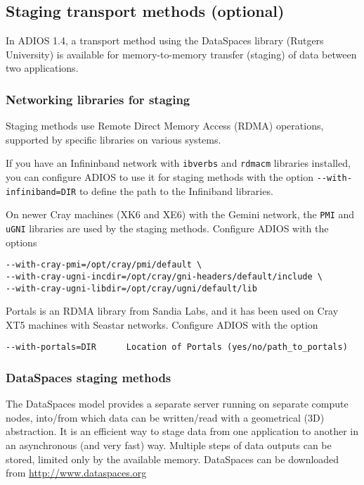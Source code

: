 \subsection{Staging transport methods (optional)}

In ADIOS 1.4, a transport method using the DataSpaces library (Rutgers University) 
is available for memory-to-memory transfer (staging) of data between two 
applications. 

\subsubsection{Networking libraries for staging}

Staging methods use Remote Direct Memory Access (RDMA) operations, supported by specific libraries 
on various systems. 

\vspace*{6pt}
If you have an Infininband network with \verb+ibverbs+ and \verb+rdmacm+ libraries installed, you can configure ADIOS to use it for staging methods with the option
\verb+--with-infiniband=DIR+  to define the path to the Infiniband libraries. 

\vspace*{6pt}
On newer Cray machines (XK6 and XE6) with the Gemini network, the \verb+PMI+ and \verb+uGNI+ libraries are used by the staging methods. Configure ADIOS with the options

\begin{lstlisting}
--with-cray-pmi=/opt/cray/pmi/default \
--with-cray-ugni-incdir=/opt/cray/gni-headers/default/include \
--with-cray-ugni-libdir=/opt/cray/ugni/default/lib
\end{lstlisting}

\vspace*{6pt}
Portals is an RDMA library from Sandia Labs, and it has been used on Cray XT5 machines with Seastar networks. Configure ADIOS with the option

\verb+--with-portals=DIR      Location of Portals (yes/no/path_to_portals)+

\subsubsection{DataSpaces staging methods}
The DataSpaces model provides a separate server running on separate compute nodes, into/from which data can be written/read with a geometrical (3D) abstraction. It is an efficient way to stage data from one application to another in an asynchronous (and very fast) way. Multiple steps of data outputs can be stored, limited only by the available memory. DataSpaces can be downloaded from \url{http://www.dataspaces.org}

